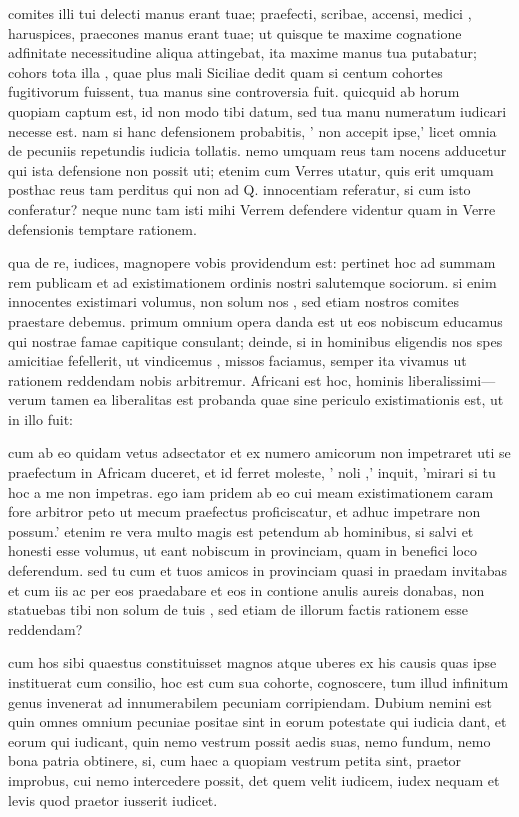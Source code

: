  comites illi tui delecti manus erant tuae; praefecti, scribae, accensi, medici , haruspices, praecones manus erant tuae; ut quisque te maxime cognatione adfinitate necessitudine aliqua attingebat, ita maxime manus tua putabatur; cohors tota illa , quae plus mali Siciliae dedit quam si centum cohortes fugitivorum fuissent, tua manus sine controversia fuit. quicquid ab horum quopiam captum est, id non modo tibi datum, sed tua manu numeratum iudicari necesse est. nam si hanc defensionem probabitis, ' non accepit ipse,' licet omnia de pecuniis repetundis iudicia tollatis. nemo umquam reus tam nocens adducetur qui ista defensione non possit uti; etenim cum Verres utatur, quis erit umquam posthac reus tam perditus qui non ad Q. \Muci innocentiam referatur, si cum isto conferatur? neque nunc tam isti mihi Verrem defendere videntur quam in Verre defensionis temptare rationem.

 qua de re, iudices, magnopere vobis providendum est: pertinet hoc ad summam rem publicam et ad existimationem ordinis nostri salutemque sociorum. si enim innocentes existimari volumus, non solum nos , sed etiam nostros comites praestare debemus. primum omnium opera danda est ut eos nobiscum educamus qui nostrae famae capitique consulant; deinde, si in hominibus eligendis nos spes amicitiae fefellerit, ut vindicemus , missos faciamus, semper ita vivamus ut rationem reddendam nobis arbitremur. Africani est hoc, hominis liberalissimi—verum tamen ea liberalitas est probanda quae sine periculo existimationis est, ut in illo fuit:

 cum ab eo quidam vetus adsectator et ex numero amicorum non impetraret uti se praefectum in Africam duceret, et id ferret moleste, ' noli ,' inquit, 'mirari si tu hoc a me non impetras. ego iam pridem ab eo cui meam existimationem caram fore arbitror peto ut mecum praefectus proficiscatur, et adhuc impetrare non possum.' etenim re vera multo magis est petendum ab hominibus, si salvi et honesti esse volumus, ut eant nobiscum in provinciam, quam in benefici loco deferendum. sed tu cum et tuos amicos in provinciam quasi in praedam invitabas et cum iis ac per eos praedabare et eos in contione anulis aureis donabas, non statuebas tibi non solum de tuis , sed etiam de illorum factis rationem esse reddendam?

 cum hos sibi quaestus constituisset magnos atque uberes ex his causis quas ipse instituerat cum consilio, hoc est cum sua cohorte, cognoscere, tum illud infinitum genus invenerat ad innumerabilem pecuniam corripiendam. Dubium nemini est quin omnes omnium pecuniae positae sint in eorum potestate qui iudicia dant, et eorum qui iudicant, quin nemo vestrum possit aedis suas, nemo fundum, nemo bona patria obtinere, si, cum haec a quopiam vestrum petita sint, praetor improbus, cui nemo intercedere possit, det quem velit iudicem, iudex nequam et levis quod praetor iusserit iudicet.

